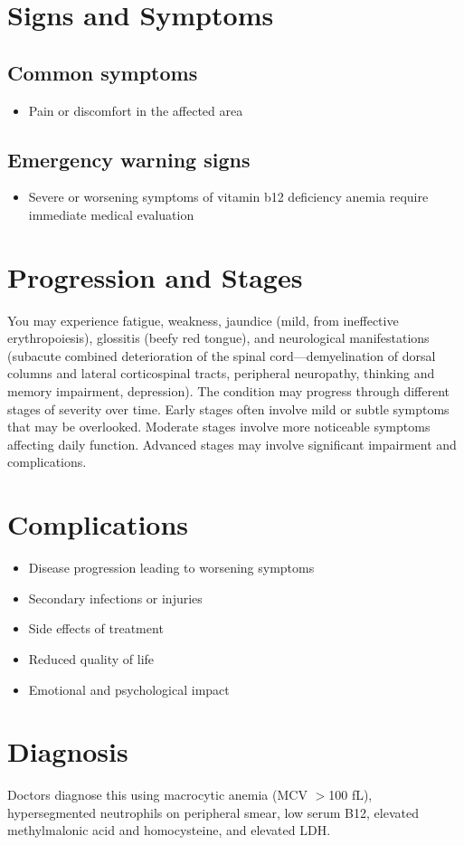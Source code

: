 \section{Signs and Symptoms}
\subsection{Common symptoms}
\begin{itemize}[noitemsep]
  \item Pain or discomfort in the affected area
  \end{itemize}
\subsection{Emergency warning signs}
\begin{itemize}[noitemsep]
  \item Severe or worsening symptoms of vitamin b12 deficiency anemia require immediate medical evaluation
\end{itemize}
\section{Progression and Stages}
You may experience fatigue, weakness, jaundice (mild, from ineffective erythropoiesis), glossitis (beefy red tongue), and neurological manifestations (subacute combined deterioration of the spinal cord---demyelination of dorsal columns and lateral corticospinal tracts, peripheral neuropathy, thinking and memory impairment, depression). The condition may progress through different stages of severity over time. Early stages often involve mild or subtle symptoms that may be overlooked. Moderate stages involve more noticeable symptoms affecting daily function. Advanced stages may involve significant impairment and complications.
\section{Complications}
\begin{itemize}[noitemsep]
  \item Disease progression leading to worsening symptoms
  \item Secondary infections or injuries
  \item Side effects of treatment
  \item Reduced quality of life
  \item Emotional and psychological impact
\end{itemize}
\section{Diagnosis}
Doctors diagnose this using macrocytic anemia (MCV $>$100 fL), hypersegmented neutrophils on peripheral smear, low serum B12, elevated methylmalonic acid and homocysteine, and elevated LDH.


